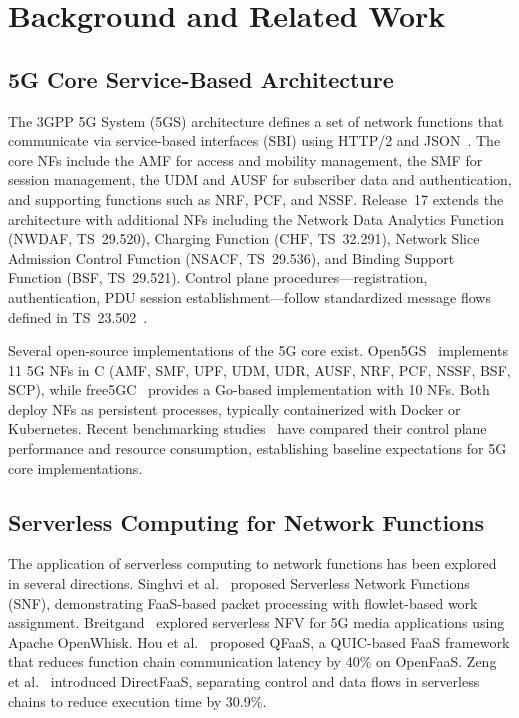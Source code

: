 \section{Background and Related Work}
\label{sec:background}

\subsection{5G Core Service-Based Architecture}

The 3GPP 5G System (5GS) architecture defines a set of network functions that communicate via service-based interfaces (SBI) using HTTP/2 and JSON~\cite{3gpp-23501}. The core NFs include the AMF for access and mobility management, the SMF for session management, the UDM and AUSF for subscriber data and authentication, and supporting functions such as NRF, PCF, and NSSF. Release~17 extends the architecture with additional NFs including the Network Data Analytics Function (NWDAF, TS~29.520), Charging Function (CHF, TS~32.291), Network Slice Admission Control Function (NSACF, TS~29.536), and Binding Support Function (BSF, TS~29.521). Control plane procedures---registration, authentication, PDU session establishment---follow standardized message flows defined in TS~23.502~\cite{3gpp-23502}.

Several open-source implementations of the 5G core exist. Open5GS~\cite{open5gs} implements 11 5G NFs in C (AMF, SMF, UPF, UDM, UDR, AUSF, NRF, PCF, NSSF, BSF, SCP), while free5GC~\cite{free5gc} provides a Go-based implementation with 10 NFs. Both deploy NFs as persistent processes, typically containerized with Docker or Kubernetes. Recent benchmarking studies~\cite{oran-bench-2024, 5gc-bench-2023} have compared their control plane performance and resource consumption, establishing baseline expectations for 5G core implementations.

\subsection{Serverless Computing for Network Functions}

The application of serverless computing to network functions has been explored in several directions. Singhvi et al.~\cite{snf-2020} proposed Serverless Network Functions (SNF), demonstrating FaaS-based packet processing with flowlet-based work assignment. Breitgand~\cite{5gmedia-2018} explored serverless NFV for 5G media applications using Apache OpenWhisk. Hou et al.~\cite{qfaas-2022} proposed QFaaS, a QUIC-based FaaS framework that reduces function chain communication latency by 40\% on OpenFaaS. Zeng et al.~\cite{directfaas-2024} introduced DirectFaaS, separating control and data flows in serverless chains to reduce execution time by 30.9\%.

